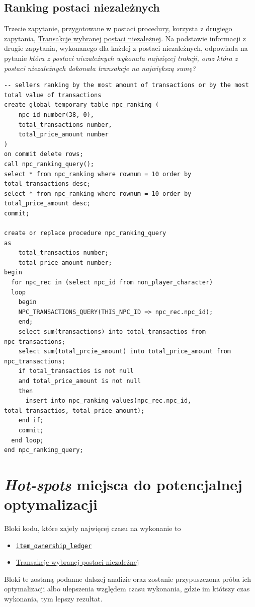 \documentclass[11pt]{article}
\begin{document}
\subsection{Ranking postaci niezależnych}
\label{sec:orgec7f6ff}
Trzecie zapytanie, przygotowane w postaci procedury, korzysta z drugiego zapytania,
\hyperref[sec:org134c64a]{Transakcje wybranej postaci niezależnej}. Na podstawie informacji z drugie zapytania, wykonanego
dla każdej z postaci niezależnych, odpowiada na pytanie \emph{która z postaci niezależnych wykonała
najwięcej trakcji, oraz która z postaci niezależnych dokonała transakcje na największą sumę?}
\begin{verbatim}
-- sellers ranking by the most amount of transactions or by the most total value of transactions
create global temporary table npc_ranking (
    npc_id number(38, 0),
    total_transactions number,
    total_price_amount number
)
on commit delete rows;
call npc_ranking_query();
select * from npc_ranking where rownum = 10 order by total_transactions desc;
select * from npc_ranking where rownum = 10 order by total_price_amount desc;
commit;

create or replace procedure npc_ranking_query
as
    total_transactios number;
    total_price_amount number;
begin
  for npc_rec in (select npc_id from non_player_character)
  loop
    begin
    NPC_TRANSACTIONS_QUERY(THIS_NPC_ID => npc_rec.npc_id);
    end;
    select sum(transactions) into total_transactios from npc_transactions;
    select sum(total_prcie_amount) into total_price_amount from npc_transactions;
    if total_transactios is not null
    and total_price_amount is not null
    then
      insert into npc_ranking values(npc_rec.npc_id, total_transactios, total_price_amount);
    end if;
    commit;
  end loop;
end npc_ranking_query;
\end{verbatim}

\section{\emph{Hot-spots} miejsca do potencjalnej optymalizacji}
\label{sec:org6b6f7c6}
Bloki kodu, które zajeły najwięcej czasu na wykonanie to
\begin{itemize}
\item \hyperref[sec:org340c0bf]{\texttt{item\_ownership\_ledger}}
\item \hyperref[sec:org134c64a]{Transakcje wybranej postaci niezależnej}
\end{itemize}
Bloki te zostaną podanne dalszej analizie oraz zostanie przypuszczona próba ich optymalizacji
albo ulepszenia względem czasu wykonania, gdzie im któtszy czas wykonania, tym lepszy rezultat.
\end{document}
